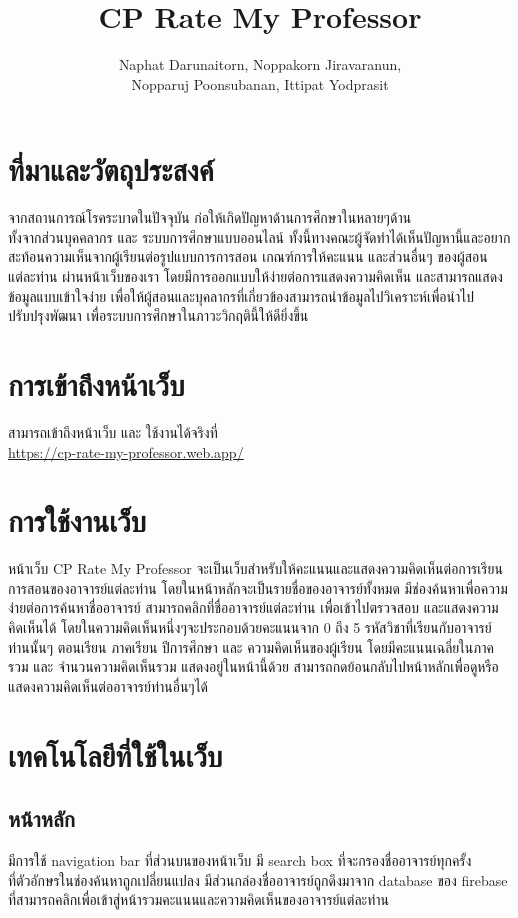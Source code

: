 \documentclass[17pt]{extarticle}
\title{CP Rate My Professor}
\author{Naphat Darunaitorn, Noppakorn Jiravaranun,\\ Nopparuj Poonsubanan, Ittipat Yodprasit}
\begin{document}
\maketitle
\pagebreak
\tableofcontents
\pagebreak
\section{ที่มาและวัตถุประสงค์}

จากสถานการณ์โรคระบาดในปัจจุบัน ก่อให้เกิดปัญหาด้านการศึกษาในหลายๆด้าน\\
ทั้งจากส่วนบุคคลากร และ ระบบการศึกษาแบบออนไลน์
ทั้งนี้ทางคณะผู้จัดทำได้เห็นปัญหานี้และอยากสะท้อนความเห็นจากผู้เรียนต่อรูปแบบการการสอน
เกณฑ์การให้คะแนน และส่วนอื่นๆ ของผู้สอนแต่ละท่าน ผ่านหน้าเว็บของเรา
โดยมีการออกแบบให้ง่ายต่อการแสดงความคิดเห็น และสามารถแสดงข้อมูลแบบเข้าใจง่าย
เพื่อให้ผู้สอนและบุคลากรที่เกี่ยวข้องสามารถนำข้อมูลไปวิเคราะห์เพื่อนำไปปรับปรุงพัฒนา
เพื่อระบบการศึกษาในภาวะวิกฤตินี้ให้ดียิ่งขึ้น

\section{การเข้าถึงหน้าเว็บ}
สามารถเข้าถึงหน้าเว็บ และ ใช้งานได้จริงที่\\{\color{blue}\url{https://cp-rate-my-professor.web.app/}}

\section{การใช้งานเว็บ}
หน้าเว็บ CP Rate My Professor จะเป็นเว็บสำหรับให้คะแนนและแสดงความคิดเห็นต่อการเรียนการสอนของอาจารย์แต่ละท่าน
โดยในหน้าหลักจะเป็นรายชื่อของอาจารย์ทั้งหมด มีช่องค้นหาเพื่อความง่ายต่อการค้นหาชื่ออาจารย์
สามารถคลิกที่ชื่ออาจารย์แต่ละท่าน เพื่อเข้าไปตรวจสอบ และแสดงความคิดเห็นได้
โดยในความคิดเห็นหนึ่งๆจะประกอบด้วยคะแนนจาก 0 ถึง 5 รหัสวิชาที่เรียนกับอาจารย์ท่านนั้นๆ ตอนเรียน ภาคเรียน ปีการศึกษา และ ความคิดเห็นของผู้เรียน
โดยมีคะแนนเฉลี่ยในภาครวม และ จำนวนความคิดเห็นรวม แสดงอยู่ในหน้านี้ด้วย สามารถกดย้อนกลับไปหน้าหลักเพื่อดูหรือแสดงความคิดเห็นต่ออาจารย์ท่านอื่นๆได้

\pagebreak
\section{เทคโนโลยีที่ใช้ในเว็บ}
\subsection{หน้าหลัก}

มีการใช้ navigation bar ที่ส่วนบนของหน้าเว็บ มี search box ที่จะกรองชื่ออาจารย์ทุกครั้ง\\
ที่ตัวอักษรในช่องค้นหาถูกเปลี่ยนแปลง มีส่วนกล่องชื่ออาจารย์ถูกดึงมาจาก database ของ firebase
ที่สามารถคลิกเพื่อเข้าสู่หน้ารวมคะแนนและความคิดเห็นของอาจารย์แต่ละท่าน
\end{document}
